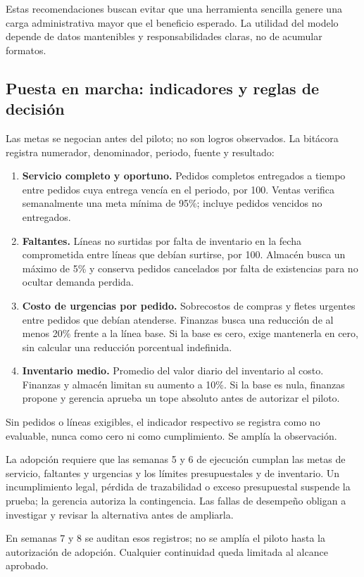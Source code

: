 \documentclass[12pt,spanish,letterpaper,oneside]{article}
\begin{document}
Estas recomendaciones buscan evitar que una herramienta sencilla genere una
carga administrativa mayor que el beneficio esperado. La utilidad del modelo
depende de datos mantenibles y responsabilidades claras, no de acumular formatos.

\clearpage
\subsection{Puesta en marcha: indicadores y reglas de decisión}
Las metas se negocian antes del piloto; no son logros observados. La bitácora
registra numerador, denominador, periodo, fuente y resultado:
\begin{enumerate}
\item \textbf{Servicio completo y oportuno.} Pedidos completos entregados a
tiempo entre pedidos cuya entrega vencía en el periodo, por 100. Ventas verifica
semanalmente una meta mínima de 95\%; incluye pedidos vencidos no entregados.
\item \textbf{Faltantes.} Líneas no surtidas por falta de inventario en la
fecha comprometida entre líneas que debían surtirse, por 100. Almacén busca
un máximo de 5\% y conserva pedidos cancelados por falta de existencias para
no ocultar demanda perdida.
\item \textbf{Costo de urgencias por pedido.} Sobrecostos de compras y fletes
urgentes entre pedidos que debían atenderse. Finanzas busca una reducción de
al menos 20\% frente a la línea base. Si la base es cero, exige mantenerla
en cero, sin calcular una reducción porcentual indefinida.
\item \textbf{Inventario medio.} Promedio del valor diario del inventario al
costo. Finanzas y almacén limitan su aumento a 10\%. Si la base es nula,
finanzas propone y gerencia aprueba un tope absoluto antes de autorizar el piloto.
\end{enumerate}

Sin pedidos o líneas exigibles, el indicador respectivo se registra como
no evaluable, nunca como cero ni como cumplimiento. Se amplía la observación.

La adopción requiere que las semanas 5 y 6 de ejecución cumplan las metas
de servicio, faltantes y urgencias y los límites presupuestales y de inventario.
Un incumplimiento legal, pérdida de trazabilidad o exceso presupuestal suspende
la prueba; la gerencia autoriza la contingencia. Las fallas de desempeño obligan
a investigar y revisar la alternativa antes de ampliarla.

En semanas 7 y 8 se auditan esos registros; no se amplía el piloto hasta
la autorización de adopción. Cualquier continuidad queda limitada al alcance aprobado.
\end{document}
